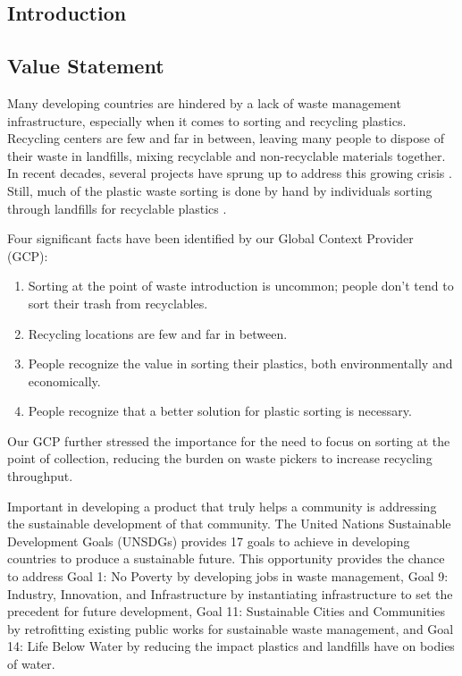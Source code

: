 \documentclass[12pt]{article}
\begin{document}
    \newpage
\begin{multicols*}{2}
    

    \section{Introduction}
        \subsection{Value Statement}\label{subsec:ValueStatement}

            Many developing countries are hindered by a lack of waste management infrastructure, especially when it comes to sorting and recycling plastics. Recycling centers are few and far in between, leaving many people to dispose of their waste in landfills, mixing recyclable and non-recyclable materials together. In recent decades, several projects have sprung up to address this growing crisis \cite{wansi_2022} \cite{dow_2022}. Still, much of the plastic waste sorting is done by hand by individuals sorting through landfills for recyclable plastics \cite{GhanaSorting}.
            
            Four significant facts have been identified by our Global Context Provider (GCP): 

            \begin{enumerate}
                \item Sorting at the point of waste introduction is uncommon; people don't tend to sort their trash from recyclables.
                \item Recycling locations are few and far in between.
                \item People recognize the value in sorting their plastics, both environmentally and economically. 
                \item People recognize that a better solution for plastic sorting is necessary.
            \end{enumerate}

            Our GCP further stressed the importance for the need to focus on sorting at the point of collection, reducing the burden on waste pickers to increase recycling throughput.

            Important in developing a product that truly helps a community is addressing the sustainable development of that community. The United Nations Sustainable Development Goals (UNSDGs) \cite{UNSDG} provides 17 goals to achieve in developing countries to produce a sustainable future. This opportunity provides the chance to address Goal 1: No Poverty by developing jobs in waste management, Goal 9: Industry, Innovation, and Infrastructure by instantiating infrastructure to set the precedent for future development, Goal 11: Sustainable Cities and Communities by retrofitting existing public works for sustainable waste management, and Goal 14: Life Below Water by reducing the impact plastics and landfills have on bodies of water.


\end{multicols*}
\end{document}
